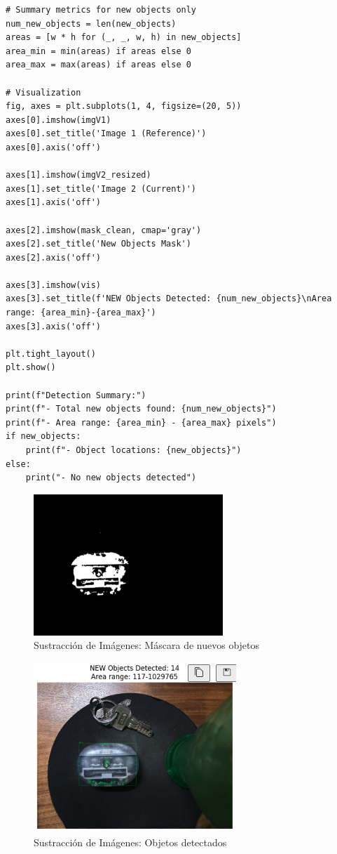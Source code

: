 \documentclass[12pt,letterpaper]{article}
\begin{document}
\begin{verbatim}
# Summary metrics for new objects only
num_new_objects = len(new_objects)
areas = [w * h for (_, _, w, h) in new_objects]
area_min = min(areas) if areas else 0
area_max = max(areas) if areas else 0

# Visualization
fig, axes = plt.subplots(1, 4, figsize=(20, 5))
axes[0].imshow(imgV1)
axes[0].set_title('Image 1 (Reference)')
axes[0].axis('off')

axes[1].imshow(imgV2_resized)
axes[1].set_title('Image 2 (Current)')
axes[1].axis('off')

axes[2].imshow(mask_clean, cmap='gray')
axes[2].set_title('New Objects Mask')
axes[2].axis('off')

axes[3].imshow(vis)
axes[3].set_title(f'NEW Objects Detected: {num_new_objects}\nArea range: {area_min}-{area_max}')
axes[3].axis('off')

plt.tight_layout()
plt.show()

print(f"Detection Summary:")
print(f"- Total new objects found: {num_new_objects}")
print(f"- Area range: {area_min} - {area_max} pixels")
if new_objects:
    print(f"- Object locations: {new_objects}")
else:
    print("- No new objects detected")
\end{verbatim}


\begin{figure}[H]
  \centering
  \includegraphics[width=0.5\linewidth]{figuras/sustraccion_mascara.png}
  \caption{Sustracción de Imágenes: Máscara de nuevos objetos}
  \label{fig:sustraccion_mascara}
\end{figure}

\begin{figure}[H]
  \centering
  \includegraphics[width=0.5\linewidth]{figuras/sustraccion_objetos.png}
  \caption{Sustracción de Imágenes: Objetos detectados}
  \label{fig:sustraccion_objetos}
\end{figure}
\end{document}

